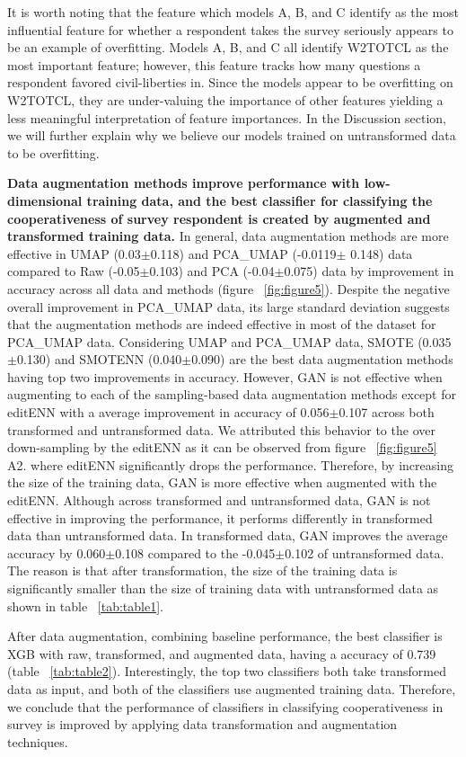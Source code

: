 It is worth noting that the feature which models A, B, and C identify as the most influential feature for whether a respondent takes the survey seriously appears to be an example of overfitting. Models A, B, and C all identify W2TOTCL as the most important feature; however, this feature tracks how many questions a respondent favored civil-liberties in. Since the models appear to be overfitting on W2TOTCL, they are under-valuing the importance of other features yielding a less meaningful interpretation of feature importances. In the Discussion section, we will further explain why we believe our models trained on untransformed data to be overfitting.

\textbf{Data augmentation methods improve performance with low-dimensional training data, and the best classifier for classifying the cooperativeness of survey respondent is created by augmented and transformed training data.} In general, data augmentation methods are more effective in UMAP (0.03$\pm$0.118) and PCA\_UMAP (-0.0119$\pm$ 0.148) data compared to Raw (-0.05$\pm$0.103) and PCA (-0.04$\pm$0.075) data by improvement in accuracy across all data and methods (figure ~\ref{fig:figure5}). Despite the negative overall improvement in PCA\_UMAP data, its large standard deviation suggests that the augmentation methods are indeed effective in most of the dataset for PCA\_UMAP data. Considering UMAP and PCA\_UMAP data, SMOTE (0.035$\pm$0.130) and SMOTENN (0.040$\pm$0.090) are the best data augmentation methods having top two improvements in accuracy. However, GAN is not effective when augmenting to each of the sampling-based data augmentation methods except for editENN with a average improvement in accuracy of 0.056$\pm$0.107 across both transformed and untransformed data. We attributed this behavior to the over down-sampling by the editENN as it can be observed from figure ~\ref{fig:figure5} A2. where editENN significantly drops the performance. Therefore, by increasing the size of the training data, GAN is more effective when augmented with the editENN. Although across transformed and untransformed data, GAN is not effective in improving the performance, it performs differently in transformed data than untransformed data. In transformed data, GAN improves the average accuracy by 0.060$\pm$0.108 compared to the -0.045$\pm$0.102 of untransformed data. The reason is that after transformation, the size of the training data is significantly smaller than the size of training data with untransformed data as shown in table ~\ref{tab:table1}.

After data augmentation, combining baseline performance, the best classifier is XGB with raw, transformed, and augmented data, having a accuracy of 0.739 (table ~\ref{tab:table2}). Interestingly, the top two classifiers both take transformed data as input, and both of the classifiers use augmented training data. Therefore, we conclude that the performance of classifiers in classifying cooperativeness in survey is improved by applying data transformation and augmentation techniques. 




